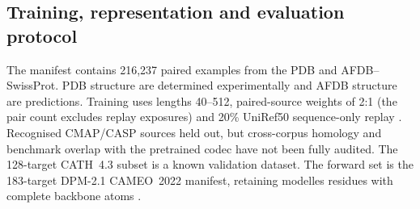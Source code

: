\subsection{Training, representation and evaluation protocol}
\label{app:protein:protocol}

The manifest contains 216{,}237 paired examples from the PDB\citep{protein:pdb} and AFDB--SwissProt\citep{protein:afdb}. PDB structure are determined experimentally and AFDB structure are predictions. Training uses lengths 40--512, paired-source weights of 2:1 (the pair count excludes replay exposures) and 20\% UniRef50 sequence-only replay \citep{protein:uniref}. Recognised CMAP/CASP sources held out, but cross-corpus homology and benchmark overlap with the pretrained codec have not been fully audited. The 128-target CATH~4.3 subset is a known validation dataset. The forward set is the 183-target DPM-2.1 CAMEO~2022 manifest, retaining modelles residues with complete backbone atoms  \citep{protein:cath,protein:cameo}.